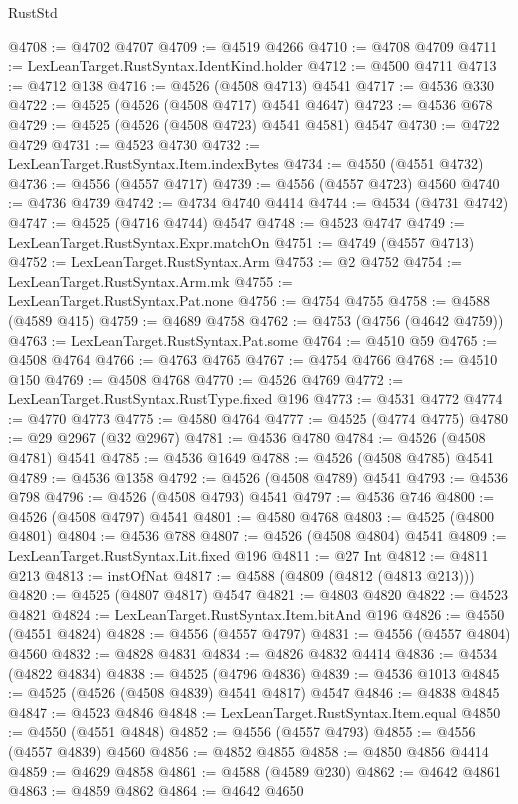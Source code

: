 \begin{lexlean}{RustStd}
\begin{coremodule}
@4708 := @4702 @4707
@4709 := @4519 @4266
@4710 := @4708 @4709
@4711 := LexLeanTarget.RustSyntax.IdentKind.holder
@4712 := @4500 @4711
@4713 := @4712 @138
@4716 := @4526 (@4508 @4713) @4541
@4717 := @4536 @330
@4722 := @4525 (@4526 (@4508 @4717) @4541 @4647)
@4723 := @4536 @678
@4729 := @4525 (@4526 (@4508 @4723) @4541 @4581) @4547
@4730 := @4722 @4729
@4731 := @4523 @4730
@4732 := LexLeanTarget.RustSyntax.Item.indexBytes
@4734 := @4550 (@4551 @4732)
@4736 := @4556 (@4557 @4717)
@4739 := @4556 (@4557 @4723) @4560
@4740 := @4736 @4739
@4742 := @4734 @4740 @4414
@4744 := @4534 (@4731 @4742)
@4747 := @4525 (@4716 @4744) @4547
@4748 := @4523 @4747
@4749 := LexLeanTarget.RustSyntax.Expr.matchOn
@4751 := @4749 (@4557 @4713)
@4752 := LexLeanTarget.RustSyntax.Arm
@4753 := @2 @4752
@4754 := LexLeanTarget.RustSyntax.Arm.mk
@4755 := LexLeanTarget.RustSyntax.Pat.none
@4756 := @4754 @4755
@4758 := @4588 (@4589 @415)
@4759 := @4689 @4758
@4762 := @4753 (@4756 (@4642 @4759))
@4763 := LexLeanTarget.RustSyntax.Pat.some
@4764 := @4510 @59
@4765 := @4508 @4764
@4766 := @4763 @4765
@4767 := @4754 @4766
@4768 := @4510 @150
@4769 := @4508 @4768
@4770 := @4526 @4769
@4772 := LexLeanTarget.RustSyntax.RustType.fixed @196
@4773 := @4531 @4772
@4774 := @4770 @4773
@4775 := @4580 @4764
@4777 := @4525 (@4774 @4775)
@4780 := @29 @2967 (@32 @2967)
@4781 := @4536 @4780
@4784 := @4526 (@4508 @4781) @4541
@4785 := @4536 @1649
@4788 := @4526 (@4508 @4785) @4541
@4789 := @4536 @1358
@4792 := @4526 (@4508 @4789) @4541
@4793 := @4536 @798
@4796 := @4526 (@4508 @4793) @4541
@4797 := @4536 @746
@4800 := @4526 (@4508 @4797) @4541
@4801 := @4580 @4768
@4803 := @4525 (@4800 @4801)
@4804 := @4536 @788
@4807 := @4526 (@4508 @4804) @4541
@4809 := LexLeanTarget.RustSyntax.Lit.fixed @196
@4811 := @27 Int
@4812 := @4811 @213
@4813 := instOfNat
@4817 := @4588 (@4809 (@4812 (@4813 @213)))
@4820 := @4525 (@4807 @4817) @4547
@4821 := @4803 @4820
@4822 := @4523 @4821
@4824 := LexLeanTarget.RustSyntax.Item.bitAnd @196
@4826 := @4550 (@4551 @4824)
@4828 := @4556 (@4557 @4797)
@4831 := @4556 (@4557 @4804) @4560
@4832 := @4828 @4831
@4834 := @4826 @4832 @4414
@4836 := @4534 (@4822 @4834)
@4838 := @4525 (@4796 @4836)
@4839 := @4536 @1013
@4845 := @4525 (@4526 (@4508 @4839) @4541 @4817) @4547
@4846 := @4838 @4845
@4847 := @4523 @4846
@4848 := LexLeanTarget.RustSyntax.Item.equal
@4850 := @4550 (@4551 @4848)
@4852 := @4556 (@4557 @4793)
@4855 := @4556 (@4557 @4839) @4560
@4856 := @4852 @4855
@4858 := @4850 @4856 @4414
@4859 := @4629 @4858
@4861 := @4588 (@4589 @230)
@4862 := @4642 @4861
@4863 := @4859 @4862
@4864 := @4642 @4650

\end{coremodule}
\end{lexlean}
